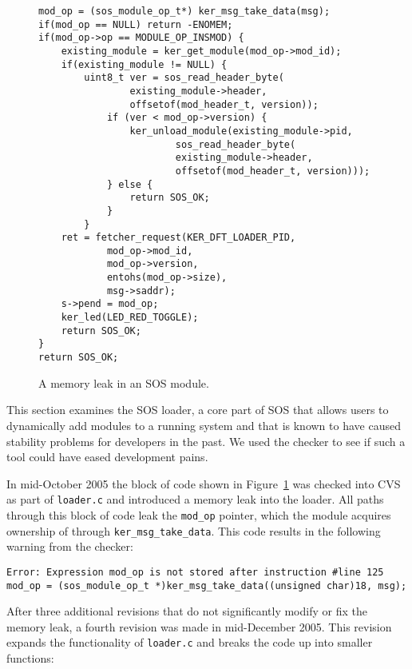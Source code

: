 \begin{figure}[tp]
\begin{footnotesize}
\begin{verbatim}
mod_op = (sos_module_op_t*) ker_msg_take_data(msg);
if(mod_op == NULL) return -ENOMEM;
if(mod_op->op == MODULE_OP_INSMOD) {
    existing_module = ker_get_module(mod_op->mod_id);
    if(existing_module != NULL) {
        uint8_t ver = sos_read_header_byte(
                existing_module->header,
                offsetof(mod_header_t, version));
            if (ver < mod_op->version) {
                ker_unload_module(existing_module->pid, 
                        sos_read_header_byte(
                        existing_module->header,
                        offsetof(mod_header_t, version)));
            } else {
                return SOS_OK;
            }
        }
    ret = fetcher_request(KER_DFT_LOADER_PID,
            mod_op->mod_id,
            mod_op->version,
            entohs(mod_op->size),
            msg->saddr);
    s->pend = mod_op;
    ker_led(LED_RED_TOGGLE);
    return SOS_OK;
}
return SOS_OK;
\end{verbatim}
\end{footnotesize}
\label{fig:leak}
\caption{A memory leak in an SOS module.}
\end{figure}

This section examines the SOS loader, a core part of SOS that allows
users to dynamically add modules to a running system and that is
known to have caused stability problems for developers in the past.
We used the checker to see if such a tool could have eased development
pains.

In mid-October 2005 the block of code shown in Figure~\ref{fig:leak}
was checked into CVS as part of {\tt loader.c} and introduced a memory
leak into the loader.  All paths through this block of code leak the
{\tt mod\_op} pointer, which the module acquires ownership of through
{\tt ker\_msg\_take\_data}.  This code results in the following
warning from the checker:

\begin{footnotesize}
\begin{verbatim}
Error: Expression mod_op is not stored after instruction #line 125
mod_op = (sos_module_op_t *)ker_msg_take_data((unsigned char)18, msg);
\end{verbatim}
\end{footnotesize}

After three additional revisions that do not significantly modify or
fix the memory leak, a fourth revision was made in mid-December 2005.
This revision expands the functionality of {\tt loader.c} and breaks
the code up into smaller functions:

